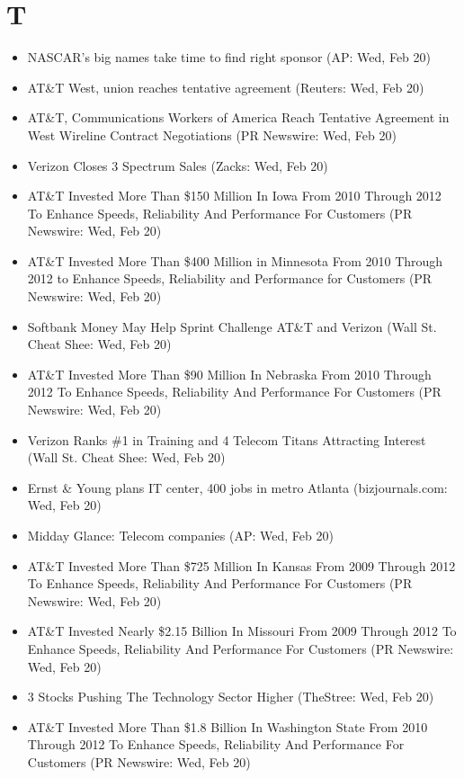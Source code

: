 \documentclass[11pt,asymmetric]{article}
\begin{document}
\section*{T}
\begin{itemize}
\item NASCAR's big names take time to find right sponsor (AP: Wed, Feb 20)
\item AT\&T West, union reaches tentative agreement (Reuters: Wed, Feb 20)
\item AT\&T, Communications Workers of America Reach Tentative Agreement in West Wireline Contract Negotiations (PR Newswire: Wed, Feb 20)
\item Verizon Closes 3 Spectrum Sales (Zacks: Wed, Feb 20)
\item AT\&T Invested More Than \$150 Million In Iowa From 2010 Through 2012 To Enhance Speeds, Reliability And Performance For Customers (PR Newswire: Wed, Feb 20)
\item AT\&T Invested More Than \$400 Million in Minnesota From 2010 Through 2012 to Enhance Speeds, Reliability and Performance for Customers (PR Newswire: Wed, Feb 20)
\item Softbank Money May Help Sprint Challenge AT\&T and Verizon (Wall St. Cheat Shee: Wed, Feb 20)
\item AT\&T Invested More Than \$90 Million In Nebraska From 2010 Through 2012 To Enhance Speeds, Reliability And Performance For Customers (PR Newswire: Wed, Feb 20)
\item Verizon Ranks \#1 in Training and 4 Telecom Titans Attracting Interest (Wall St. Cheat Shee: Wed, Feb 20)
\item Ernst \& Young plans IT center, 400 jobs in metro Atlanta (bizjournals.com: Wed, Feb 20)
\item Midday Glance: Telecom companies (AP: Wed, Feb 20)
\item AT\&T Invested More Than \$725 Million In Kansas From 2009 Through 2012 To Enhance Speeds, Reliability And Performance For Customers (PR Newswire: Wed, Feb 20)
\item AT\&T Invested Nearly \$2.15 Billion In Missouri From 2009 Through 2012 To Enhance Speeds, Reliability And Performance For Customers (PR Newswire: Wed, Feb 20)
\item 3 Stocks Pushing The Technology Sector Higher (TheStree: Wed, Feb 20)
\item AT\&T Invested More Than \$1.8 Billion In Washington State From 2010 Through 2012 To Enhance Speeds, Reliability And Performance For Customers (PR Newswire: Wed, Feb 20)

\end{itemize}
\end{document}

